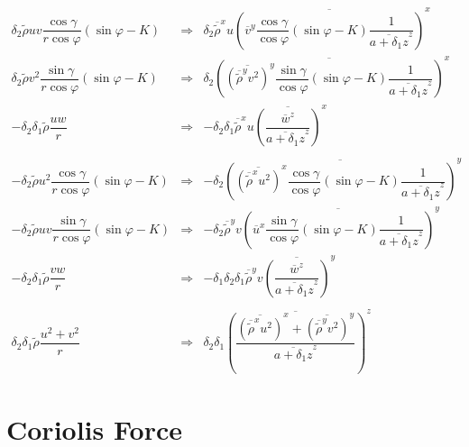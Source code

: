 \begin{eqnarray}
 \delta _{2}\tilde{\rho}  u   v
 \dfrac{ \cos\gamma}{r \cos\varphi} (\sin\varphi -K) & \Longrightarrow &
 \delta _{2} \overline{\tilde{\rho}}^{x}   u
 \overline{\left(\overline{ v }^{y}
 \dfrac{ \cos\gamma}{ \cos\varphi} (\sin\varphi -K)
 \dfrac{1}{\overline{a+\delta _{1} z}^{z}}\right)}^{x}  \\
\delta _{2}\tilde{\rho}  v ^{2}  \dfrac{ \sin\gamma  }{r \cos \varphi} (\sin\varphi -K)
& \Longrightarrow & \delta _{2}  \overline{\left( \overline{\left(\overline{\tilde{\rho}}^{y}
 v ^{2}\right)}^{y}\dfrac{ \sin\gamma}{ \cos\varphi} (\sin\varphi -K)
 \dfrac{1}{\overline{a+\delta _{1} z}^{z}}\right)}^{x}
 \\
 - \delta _{2}\delta _{1} \tilde{\rho}\dfrac{ u  w}{r}
  & \Longrightarrow &
 - \delta _{2}\delta _{1} \overline{\tilde{\rho}}^{x}  u
 \overline{\left( \dfrac{\overline{ w}^{z}}{\overline{a+\delta _{1} z}^{z}} \right)}^{x}\\
 \nonumber \\
 -  \delta _{2}\tilde{\rho}  u ^{2}  \dfrac{ \cos\gamma}{r \cos\varphi} (\sin\varphi -K)
& \Longrightarrow &  -  \delta _{2}
 \overline{\left(\overline{\left(
\overline{\tilde{\rho}}^{x}
  u ^{2}\right)}^{x}  \dfrac{ \cos\gamma}{ \cos\varphi} (\sin\varphi -K)
 \dfrac{1}{\overline{a+\delta _{1} z}^{z}}\right)}^{y}\\
 - \delta _{2}\tilde{\rho}  u   v
   \dfrac{\sin\gamma}{r \cos \varphi} (\sin\varphi -K)
& \Longrightarrow & -  \delta _{2} \overline{\tilde{\rho}}^{y} v
 \overline{\left( \overline{  u }^{x} \dfrac{ \sin\gamma}{ \cos\varphi} (\sin\varphi -K)
 \dfrac{1}{\overline{a+\delta _{1} z}^{z}}\right)}^{y} \\
-  \delta _{2}\delta _{1} \tilde{\rho}\dfrac{ v  w}{r}
& \Longrightarrow & -  \delta_1\delta _{2}\delta _{1}\overline{\tilde{\rho}}^{y}
 v \overline{\left( \dfrac{\overline{ w}^{z}}{
\overline{a+\delta _{1} z}^{z}} \right)}^{y}\\
 \nonumber \\
 \delta _{2}\delta _{1}\tilde{\rho}\dfrac{ u ^{2}+ v ^{2} }{r}
& \Longrightarrow &    \delta _{2}\delta _{1}
\overline{\left(\dfrac{ \overline{\left(\overline{\tilde{\rho}}^{x} u ^{2}\right)}^{x}
+ \overline{\left( \overline{\tilde{\rho}}^{y} v ^{2}\right)}^{y}}
{\overline{a+\delta _{1} z}^{z}}\right)}^{z}
\end{eqnarray}

\section{Coriolis Force}

